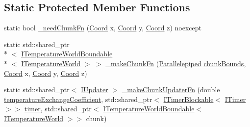\subsection*{Static Protected Member Functions}
\begin{DoxyCompactItemize}
\item 
static bool \hyperlink{class_scaling_generatable_chunked_temperature_world_injector_ab0567d5d108069282d34c8c729081b15}{\-\_\-need\-Chunk\-Fn} (\hyperlink{struct_coord}{Coord} x, \hyperlink{struct_coord}{Coord} y, \hyperlink{struct_coord}{Coord} z) noexcept
\item 
static std\-::shared\-\_\-ptr\\*
$<$ \hyperlink{class_i_temperature_world_boundable}{I\-Temperature\-World\-Boundable}\\*
$<$ \hyperlink{class_i_temperature_world}{I\-Temperature\-World} $>$ $>$ \hyperlink{class_scaling_generatable_chunked_temperature_world_injector_a43cfebfe79c0ec033087e8dfc7508473}{\-\_\-make\-Chunk\-Fn} (\hyperlink{struct_parallelepiped}{Parallelepiped} \hyperlink{class_scaling_generatable_chunked_temperature_world_injector_abc8b653a1857cf0cc9f1ab0321b40eef}{chunk\-Bounds}, \hyperlink{struct_coord}{Coord} x, \hyperlink{struct_coord}{Coord} y, \hyperlink{struct_coord}{Coord} z)
\item 
static std\-::shared\-\_\-ptr$<$ \hyperlink{class_i_updater}{I\-Updater} $>$ \hyperlink{class_scaling_generatable_chunked_temperature_world_injector_af42b84fbcce9dc6a95d052a156cdefb9}{\-\_\-make\-Chunk\-Updater\-Fn} (double \hyperlink{class_scaling_generatable_chunked_temperature_world_injector_a30555824cf848c809aceea16d01fc661}{temperature\-Exchange\-Coefficient}, std\-::shared\-\_\-ptr$<$ \hyperlink{class_i_timer_blockable}{I\-Timer\-Blockable}$<$ \hyperlink{class_i_timer}{I\-Timer} $>$$>$ \hyperlink{class_scaling_generatable_chunked_temperature_world_injector_a9ad4c32579a542181f67aedc8bd664e2}{timer}, std\-::shared\-\_\-ptr$<$ \hyperlink{class_i_temperature_world_boundable}{I\-Temperature\-World\-Boundable}$<$ \hyperlink{class_i_temperature_world}{I\-Temperature\-World} $>$$>$ chunk)
\end{DoxyCompactItemize}
